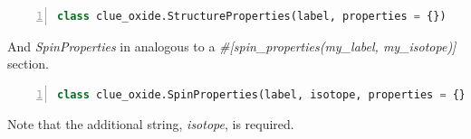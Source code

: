 \documentclass{book}
\begin{document}
\begin{lstlisting}[frame=single,numbers=left,language=python]
class clue_oxide.StructureProperties(label, properties = {})
\end{lstlisting}
And \textit{SpinProperties} in analogous to a 
\textit{\#[spin\_properties(my\_label, my\_isotope)]} section.
\begin{lstlisting}[frame=single,numbers=left,language=python]
class clue_oxide.SpinProperties(label, isotope, properties = {})
\end{lstlisting}
Note that the additional string, \textit{isotope}, is required.
\end{document}
